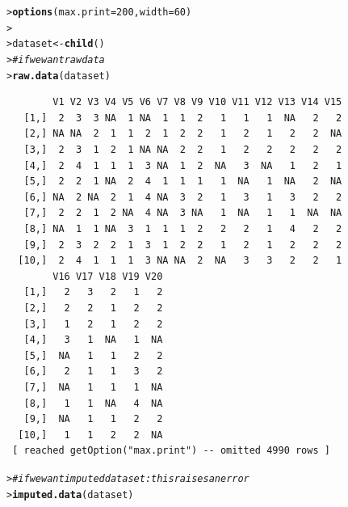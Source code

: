 \documentclass{article}\usepackage[]{graphicx}\usepackage[]{color}
\makeatletter
\newcommand{\hlnum}[1]{\textcolor[rgb]{0.686,0.059,0.569}{#1}}%
\newcommand{\hlcom}[1]{\textcolor[rgb]{0.678,0.584,0.686}{\textit{#1}}}%
\newcommand{\hlstd}[1]{\textcolor[rgb]{0.345,0.345,0.345}{#1}}%
\newcommand{\hlkwb}[1]{\textcolor[rgb]{0.69,0.353,0.396}{#1}}%
\newcommand{\hlkwc}[1]{\textcolor[rgb]{0.333,0.667,0.333}{#1}}%
\newcommand{\hlkwd}[1]{\textcolor[rgb]{0.737,0.353,0.396}{\textbf{#1}}}%
\newenvironment{kframe}{%
 \def\at@end@of@kframe{}%
 \ifinner\ifhmode%
  \def\at@end@of@kframe{\end{minipage}}%
  \begin{minipage}{\columnwidth}%
 \fi\fi%
 \def\FrameCommand##1{\hskip\@totalleftmargin \hskip-\fboxsep
 \colorbox{shadecolor}{##1}\hskip-\fboxsep
     \hskip-\linewidth \hskip-\@totalleftmargin \hskip\columnwidth}%
 \MakeFramed {\advance\hsize-\width
   \@totalleftmargin\z@ \linewidth\hsize
   \@setminipage}}%
 {\par\unskip\endMakeFramed%
 \at@end@of@kframe}
\newenvironment{knitrout}{}{} %
\makeatother
\begin{document}
\begin{knitrout}
\color{fgcolor}\begin{kframe}
\begin{alltt}
\hlstd{> }\hlkwd{options}\hlstd{(}\hlkwc{max.print} \hlstd{=} \hlnum{200}\hlstd{,} \hlkwc{width} \hlstd{=} \hlnum{60}\hlstd{)}
\hlstd{> }
\hlstd{> }\hlstd{dataset} \hlkwb{<-} \hlkwd{child}\hlstd{()}
\hlstd{> }\hlcom{# if we want raw data}
\hlstd{> }\hlkwd{raw.data}\hlstd{(dataset)}
\end{alltt}
\begin{verbatim}
        V1 V2 V3 V4 V5 V6 V7 V8 V9 V10 V11 V12 V13 V14 V15
   [1,]  2  3  3 NA  1 NA  1  1  2   1   1   1  NA   2   2
   [2,] NA NA  2  1  1  2  1  2  2   1   2   1   2   2  NA
   [3,]  2  3  1  2  1 NA NA  2  2   1   2   2   2   2   2
   [4,]  2  4  1  1  1  3 NA  1  2  NA   3  NA   1   2   1
   [5,]  2  2  1 NA  2  4  1  1  1   1  NA   1  NA   2  NA
   [6,] NA  2 NA  2  1  4 NA  3  2   1   3   1   3   2   2
   [7,]  2  2  1  2 NA  4 NA  3 NA   1  NA   1   1  NA  NA
   [8,] NA  1  1 NA  3  1  1  1  2   2   2   1   4   2   2
   [9,]  2  3  2  2  1  3  1  2  2   1   2   1   2   2   2
  [10,]  2  4  1  1  1  3 NA NA  2  NA   3   3   2   2   1
        V16 V17 V18 V19 V20
   [1,]   2   3   2   1   2
   [2,]   2   2   1   2   2
   [3,]   1   2   1   2   2
   [4,]   3   1  NA   1  NA
   [5,]  NA   1   1   2   2
   [6,]   2   1   1   3   2
   [7,]  NA   1   1   1  NA
   [8,]   1   1  NA   4  NA
   [9,]  NA   1   1   2   2
  [10,]   1   1   2   2  NA
 [ reached getOption("max.print") -- omitted 4990 rows ]
\end{verbatim}
\begin{alltt}
\hlstd{> }\hlcom{# if we want imputed dataset: this raises an error}
\hlstd{> }\hlkwd{imputed.data}\hlstd{(dataset)}
\end{alltt}



\end{kframe}
\end{knitrout}
\end{document}
